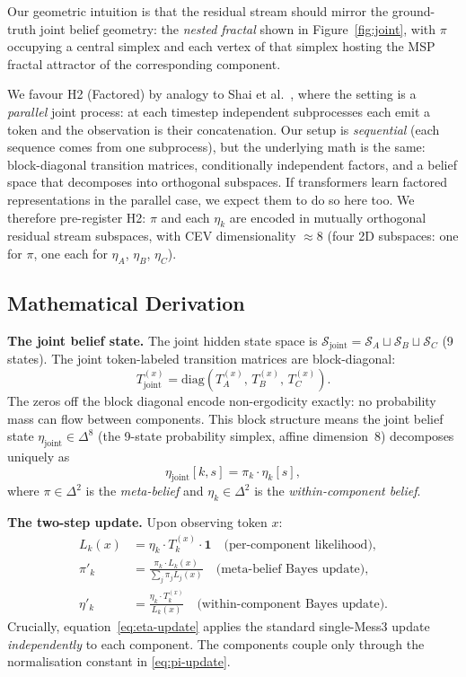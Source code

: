 \documentclass{article}
\begin{document}
Our geometric intuition is that the residual stream should mirror the
ground-truth joint belief geometry: the \emph{nested fractal} shown in
Figure~\ref{fig:joint}, with $\pi$ occupying a central simplex and each vertex
of that simplex hosting the MSP fractal attractor of the corresponding
component.

We favour H2 (Factored) by analogy to Shai et al.~\cite{shai2025factored},
where the setting is a \emph{parallel} joint process: at each timestep
independent subprocesses each emit a token and the observation is their
concatenation.
Our setup is \emph{sequential} (each sequence comes from one subprocess), but
the underlying math is the same: block-diagonal transition matrices,
conditionally independent factors, and a belief space that decomposes into
orthogonal subspaces.
If transformers learn factored representations in the parallel case, we expect
them to do so here too.
We therefore pre-register H2: $\pi$ and each $\eta_k$ are encoded in mutually
orthogonal residual stream subspaces, with CEV dimensionality $\approx 8$
(four 2D subspaces: one for $\pi$, one each for $\eta_A$, $\eta_B$, $\eta_C$).

\subsection{Mathematical Derivation}
\label{sec:math}

\textbf{The joint belief state.}
The joint hidden state space is $\mathcal{S}_\mathrm{joint} = \mathcal{S}_A
\sqcup \mathcal{S}_B \sqcup \mathcal{S}_C$ (9 states).
The joint token-labeled transition matrices are block-diagonal:
\[
T^{(x)}_\mathrm{joint} = \mathrm{diag}\!\left(T_A^{(x)},\, T_B^{(x)},\,
T_C^{(x)}\right).
\]
The zeros off the block diagonal encode non-ergodicity exactly: no probability
mass can flow between components.
This block structure means the joint belief state $\eta_\mathrm{joint} \in
\Delta^8$ (the 9-state probability simplex, affine dimension~8) decomposes uniquely as
\[
\eta_\mathrm{joint}[k, s] = \pi_k \cdot \eta_k[s],
\]
where $\pi \in \Delta^2$ is the \emph{meta-belief} and $\eta_k \in \Delta^2$
is the \emph{within-component belief}.

\textbf{The two-step update.}
Upon observing token $x$:
\begin{align}
L_k(x) &= \eta_k \cdot T_k^{(x)} \cdot \mathbf{1}
          \quad \text{(per-component likelihood)}, \label{eq:likelihood}\\
\pi'_k &= \frac{\pi_k \cdot L_k(x)}{\sum_{j} \pi_j L_j(x)}
          \quad \text{(meta-belief Bayes update)}, \label{eq:pi-update}\\
\eta'_k &= \frac{\eta_k \cdot T_k^{(x)}}{L_k(x)}
           \quad \text{(within-component Bayes update)}. \label{eq:eta-update}
\end{align}
Crucially, equation~\eqref{eq:eta-update} applies the standard single-Mess3
update \emph{independently} to each component.
The components couple only through the normalisation constant in
\eqref{eq:pi-update}.
\end{document}
